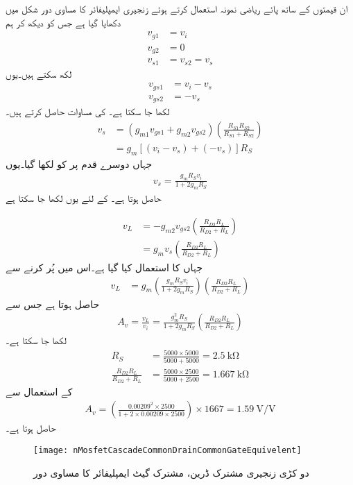 ان قیمتوں کے ساتھ پائے ریاضی نمونہ استعمال کرتے ہوئے زنجیری ایمپلیفائر کا مساوی دور شکل  میں دکھایا گیا ہے جس کو دیکھ کر ہم
\begin{align*}
v_{g1}&=v_i\\
v_{g2}&=0\\
v_{s1}&=v_{s2}=v_s
\end{align*}
لکھ سکتے ہیں۔یوں
\begin{align*}
v_{gs1}&=v_i-v_s\\
v_{gs2}&=-v_s
\end{align*}
لکھا جا سکتا ہے۔ کی مساوات حاصل کرتے ہیں۔
\begin{align*}
v_s &=\left(g_{m1} v_{gs1}+g_{m2} v_{gs2} \right) \left(\frac{R_{S1} R_{S2}}{R_{S1}+R_{S2}} \right)\\
&=g_m \left[\left(v_i-v_s \right)+\left(-v_s \right) \right] R_S
\end{align*}
جہاں دوسرے قدم پر  کو  لکھا گیا۔یوں
\begin{align*}
v_s=\frac{g_m R_S v_i}{1+2 g_m R_S}
\end{align*}
حاصل ہوتا ہے۔ کے لئے یوں لکھا جا سکتا ہے

\begin{align*}
v_L&=-g_{m2} v_{gs2} \left(\frac{R_{D2} R_L}{R_{D2}+R_L} \right)\\
&=g_m v_s \left(\frac{R_{D2} R_L}{R_{D2}+R_L} \right)
\end{align*}
جہاں  کا استعمال کیا گیا ہے۔اس میں  پُر کرنے سے
\begin{align*}
v_L&=g_m \left(\frac{g_m R_S v_i}{1+2 g_m R_S}\right) \left(\frac{R_{D2} R_L}{R_{D2}+R_L} \right)
\end{align*}
حاصل ہوتا ہے جس سے
\begin{align*}
A_v=\frac{v_L}{v_i}=\frac{g_m^2 R_S}{1+2 g_m R_S} \left(\frac{R_{D2} R_L}{R_{D2}+R_L} \right)
\end{align*}
لکھا جا سکتا ہے۔
\begin{align*}
R_S&=\frac{5000 \times 5000}{5000+5000}=\SI{2.5}{\kilo \ohm}\\
\frac{R_{D2} R_L}{R_{D2}+R_L}&=\frac{5000 \times 2500}{5000+2500}=\SI{1.667}{\kilo \ohm}
\end{align*}
کے استعمال سے
\begin{align*}
A_v=\left(\frac{0.00209^2 \times 2500}{1+2 \times 0.00209 \times 2500}\right)  \times 1667=\SI{1.59}{\volt \per \volt}
\end{align*}
حاصل ہوتا ہے۔
%
\begin{figure}
\centering
\texttt{[image: nMosfetCascadeCommonDrainCommonGateEquivelent]}
\caption{دو کڑی زنجیری مشترک ڈرین، مشترک گیٹ ایمپلیفائر کا مساوی دور}
\label{شکل_ماسفیٹ_زنجیری_مشترک_محاصل_مشترک_گیٹ_مساوی}
\end{figure}

